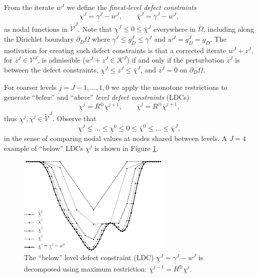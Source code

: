 \documentclass[letterpaper,final,12pt,reqno]{amsart}
\theoremstyle{cstyle}
\theoremstyle{cstyle*}
\theoremstyle{dstyle}
\numberwithin{equation}{section}
\numberwithin{figure}{section}
\numberwithin{table}{section}
\numberwithin{theorem}{section}
\newcommand{\cK}{\mathcal{K}}
\newcommand{\cV}{\mathcal{V}}
\newcommand{\maxR}{R^{\bm{\oplus}}}
\newcommand{\minR}{R^{\bm{\ominus}}}
\begin{document}
From the iterate $w^J$ we define the \emph{finest-level defect constraints}
\begin{equation}
\underline{\chi}^J = \underline{\gamma}^J - w^J, \qquad \overline{\chi}^J = \overline{\gamma}^J - w^J, \label{eq:fe:defectconstraints}
\end{equation}
as nodal functions in $\tilde{\mathcal{V}}^J$.  Note that $\underline{\chi}^J \le 0 \le \overline{\chi}^J$ everywhere in $\overline{\Omega}$, including along the Dirichlet boundary $\partial_D\Omega$ where $\underline{\gamma}^J \le g_D^J \le \overline{\gamma}^J$ and $w^J = g_D^J = g_D$.  The motivation for creating such defect constraints \cite{GraeserKornhuber2009} is that a corrected iterate $w^J + z^J$, for $z^J\in\cV^J$, is admissible ($w^J + z^J \in \cK^J$) if and only if the perturbation $z^J$ is between the defect constraints, $\underline{\chi}^J \le z^J \le \overline{\chi}^J$, and $z^J=0$ on $\partial_D\Omega$.

For coarser levels $j=J-1,\dots,1,0$ we apply the monotone restrictions to generate ``\emph{below}'' and ``\emph{above}'' \emph{level defect constraints} (LDCs):
\begin{equation}
\underline{\chi}^{j} = \maxR \underline{\chi}^{j+1}, \qquad \overline{\chi}^{j} = \minR \overline{\chi}^{j+1}, \label{eq:fe:chilevels}
\end{equation}
thus $\underline{\chi}^{j},\overline{\chi}^{j} \in \tilde{\mathcal{V}}^J$.  Observe that
\begin{equation}
\underline{\chi}^{J} \le \dots \le \underline{\chi}^0 \le 0 \le \overline{\chi}^0 \le \dots \le \overline{\chi}^J, \label{eq:fe:chiordering}
\end{equation}
in the sense of comparing nodal values at nodes shared between levels.  A $J=4$ example of ``below'' LDCs $\underline{\chi}^j$ is shown in Figure \ref{fig:chiphilevels}. 

\begin{figure}[ht]
\includegraphics[width=0.65\textwidth]{fixfigs/chiphilevels.pdf}
\caption{The ``below'' level defect constraint (LDC) $\underline{\chi}^J = \underline{\gamma}^J - w^J$ is decomposed using maximum restriction: $\underline{\chi}^{j-1} = \maxR \underline{\chi}^j$.}
\label{fig:chiphilevels}
\end{figure}
\end{document}
